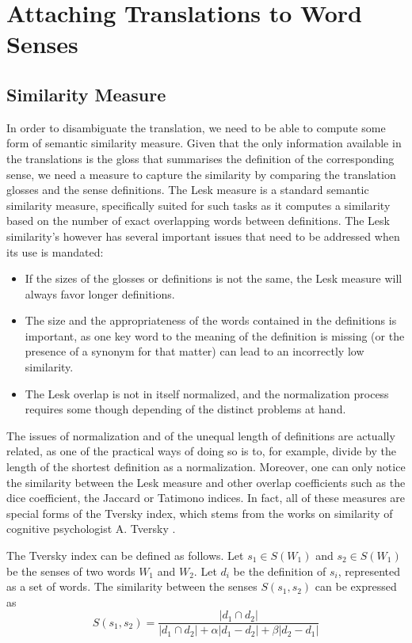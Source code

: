 \documentclass[10pt, a4paper]{article}
\begin{document}
\section{Attaching Translations to Word Senses}
\subsection{Similarity Measure}
In order to disambiguate the translation, we need to be able to compute some form of semantic similarity measure. Given that the only information available in the translations is the gloss that summarises the definition of the corresponding sense, we need a measure to capture the similarity by comparing the translation glosses and the sense definitions. The Lesk \cite{citeulike:625530} measure is a standard semantic similarity measure, specifically suited for such tasks as it computes a similarity based on the number of exact overlapping words between definitions. The Lesk similarity's however has several important issues that need to be addressed when its use is mandated: 
\begin{itemize}
	\item If the sizes of the glosses or definitions is not the same, the Lesk measure will always favor longer definitions.
	\item The size and the appropriateness of the words contained in the definitions is important, as one key word to the meaning of the definition is missing (or the presence of a synonym for that matter) can lead to an incorrectly low similarity.
	\item The Lesk overlap is not in itself normalized, and the normalization process requires some though depending of the distinct problems at hand.
\end{itemize}
 
 The issues of normalization and of the unequal length of definitions are actually related, as one of the practical ways of doing so is to, for example, divide by the length of the shortest definition as a normalization. Moreover, one can only notice the similarity between the Lesk measure and other overlap coefficients such as the dice coefficient, the Jaccard or Tatimono indices. In fact, all of these measures are special forms of the Tversky index, which stems from the works on similarity of cognitive psychologist A. Tversky \cite{tversky77similarity}.

The Tversky index can be defined as follows. Let \(s_1 \in S(W_1)\)  and \(s_2 \in S(W_1)\) be the senses of two words \(W_1\) and \(W_2\). Let \(d_i\) be the definition of \(s_i\), represented as a set of words. The similarity between the senses \(S(s_1, s_2)\) can be expressed as 
\[
S(s_1,s_2) = 
\frac{|d_1\cap d_2|}{|d_1\cap d_2| + \alpha |d_1-d_2| + \beta |d_2-d_1|}
\]
\end{document}
